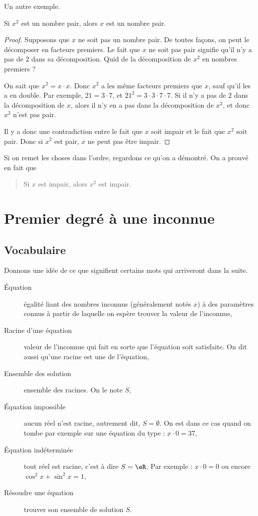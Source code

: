\documentclass{article}
\begin{document}
Un autre exemple.

\begin{proposition}
Si $x^2$ est un nombre pair, alors $x$ est un nombre pair.
\end{proposition}

\begin{proof}
Supposons que $x$ ne soit pas un nombre pair. De toutes façons, on peut le décomposer en facteurs premiers. Le fait que $x$ ne soit pas pair signifie qu'il n'y a pas de $2$ dans sa décomposition. Quid de la décomposition de $x^2$ en nombres premiers ?

On sait que $x^2=x\cdot x$. Donc $x^2$ a les même facteurs premiers que $x$, sauf qu'il les a en double. Par exemple, $21=3\cdot 7$, et $21^2=3\cdot 3\cdot 7\cdot 7$. Si il n'y a pas de $2$ dans la décomposition de $x$, alors il n'y en a pas dans la décomposition de $x^2$, et donc $x^2$ n'est pas pair.

Il y a donc une contradiction entre le fait que $x$ soit impair et le fait que $x^2$ soit pair. Donc si $x^2$ est pair, $x$ ne peut pas être impair.
\end{proof}

Si on remet les choses dans l'ordre, regardons ce qu'on a démontré. On a prouvé en fait que 
\begin{quote}
Si $x$ est impair, alors $x^2$ est impair.
\end{quote}

\section{Premier degré à une inconnue}

\subsection{Vocabulaire}

Donnons une idée de ce que signifient certains mots qui arriveront dans la suite.
\begin{description}
\item[Équation] égalité liant des nombres inconnus (généralement notés $x$) à des paramètres connus à partir de laquelle on espère trouver la valeur de l'inconnue,
\item[Racine d'une équation] valeur de l'inconnue qui fait en sorte que l'équation soit satisfaite. On dit aussi qu'une racine est une  de l'équation,
\item[Ensemble des solution] ensemble des racines. On le note $S$,
\item[Équation impossible] aucun réel n'est racine, autrement dit, $S=\emptyset$. On est dans ce cas quand on tombe par exemple sur une équation du type : $x\cdot 0=37$,
\item[Équation indéterminée] tout réel est racine, c'est à dire $S=\eR$. Par exemple : $x\cdot 0=0$ ou encore $\cos^{2} x+\sin^{2}x=1$,
\item[Résoudre une équation] trouver son ensemble de solution $S$.
\end{description}
\end{document}
